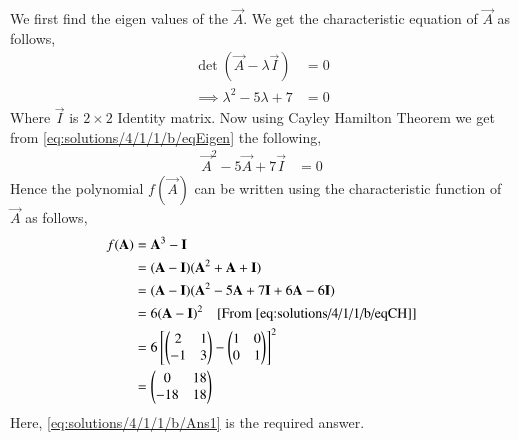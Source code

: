 We first find the eigen values of the $\vec{A}$. We get the characteristic equation of $\vec{A}$ as follows,
\begin{align}
\det{(\vec{A} - \lambda \vec{I})} &= 0\\
\implies\lambda^2 - 5\lambda+7 &=0\label{eq:solutions/4/1/1/b/eqEigen}
\end{align}
Where $\vec{I}$ is $2 \times 2$ Identity matrix. Now using Cayley Hamilton Theorem we get from \eqref{eq:solutions/4/1/1/b/eqEigen} the following,
\begin{align}
\vec{A}^2 - 5\vec{A}+7\vec{I} &= 0\label{eq:solutions/4/1/1/b/eqCH}
\end{align}
Hence the polynomial $f(\vec{A})$ can be written using the characteristic function of $\vec{A}$ as follows,
\begin{align}
f(\mathbf{A}) &= \mathbf{A}^3 - \mathbf{I}\\
&= (\mathbf{A-I})(\mathbf{A}^2+\mathbf{A}+\mathbf{I})\\
&= (\mathbf{A-I})(\mathbf{A}^2-5\mathbf{A}+7\mathbf{I}+6\mathbf{A}-6\mathbf{I})\\
&= 6(\mathbf{A-I})^2 \quad{\text{[From \eqref{eq:solutions/4/1/1/b/eqCH}]}}\\
&= 6\left[\begin{pmatrix}2&1\\-1&3\end{pmatrix} - \begin{pmatrix}1&0\\0&1\end{pmatrix}\right]^2\\
&= \begin{pmatrix}0&18\\-18&18\end{pmatrix}\label{eq:solutions/4/1/1/b/Ans1}
\end{align}
Here, \eqref{eq:solutions/4/1/1/b/Ans1} is the required answer.
